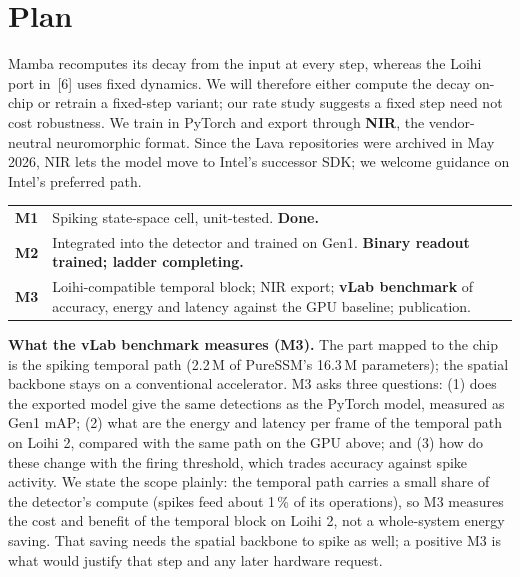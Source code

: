 \documentclass[11pt,a4paper]{article}
\begin{document}
\section{Plan}
Mamba recomputes its decay from the input at every step, whereas the Loihi port in~[6] uses fixed dynamics. We will
therefore either compute the decay on-chip or retrain a fixed-step variant; our rate study suggests a fixed step
need not cost robustness. We train in PyTorch and export through \textbf{NIR}, the vendor-neutral neuromorphic
format. Since the Lava repositories were archived in May 2026, NIR lets the model move to Intel's successor SDK;
we welcome guidance on Intel's preferred path.

\begin{center}\small
\begin{tabularx}{\textwidth}{@{}l Y@{}}
\toprule
\textbf{M1} & Spiking state-space cell, unit-tested. \textbf{Done.} \\
\textbf{M2} & Integrated into the detector and trained on Gen1. \textbf{Binary readout trained; ladder completing.} \\
\textbf{M3} & Loihi-compatible temporal block; NIR export; \textbf{vLab benchmark} of accuracy, energy and latency
against the GPU baseline; publication. \\
\bottomrule
\end{tabularx}
\end{center}

\textbf{What the vLab benchmark measures (M3).} The part mapped to the chip is the spiking temporal path
(2.2\,M of PureSSM's 16.3\,M parameters); the spatial backbone stays on a conventional accelerator. M3 asks three
questions: (1) does the exported model give the same detections as the PyTorch model, measured as Gen1 mAP;
(2) what are the energy and latency per frame of the temporal path on Loihi 2, compared with the same path on the
GPU above; and (3) how do these change with the firing threshold, which trades accuracy against spike activity.
We state the scope plainly: the temporal path carries a small share of the detector's compute (spikes feed about 1\,\% of its
operations), so M3 measures the cost and benefit of the temporal block on Loihi 2, not a whole-system energy saving.
That saving needs the spatial backbone to spike as well; a positive M3 is what would justify that step and any
later hardware request.
\end{document}
